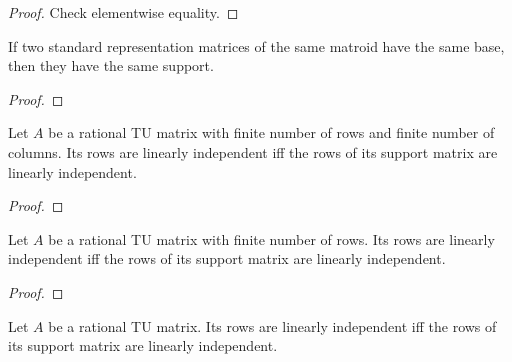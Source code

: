 \begin{proof}
    \leanok
    Check elementwise equality.
\end{proof}

\begin{lemma}
    \label{support_eq_support_of_same_matroid_same_X}
    \leanok
    If two standard representation matrices of the same matroid have the same base, then they have the same support.
\end{lemma}

\begin{proof}
    \leanok
    \SeeLean
\end{proof}

\begin{lemma}
    \label{Matrix.IsTotallyUnimodular.linearIndependent_iff_support_linearIndependent_of_finite_of_finite}
    \leanok
    Let $A$ be a rational TU matrix with finite number of rows and finite number of columns.
    Its rows are linearly independent iff the rows of its support matrix are linearly independent.
\end{lemma}

\begin{proof}
    \leanok
    \SeeLean
\end{proof}

\begin{lemma}
    \label{Matrix.IsTotallyUnimodular.linearIndependent_iff_support_linearIndependent_of_finite}
    \leanok
    Let $A$ be a rational TU matrix with finite number of rows.
    Its rows are linearly independent iff the rows of its support matrix are linearly independent.
\end{lemma}

\begin{proof}
    \leanok
    \SeeLean
\end{proof}

\begin{lemma}
    \label{Matrix.IsTotallyUnimodular.linearIndependent_iff_support_linearIndependent}
    \leanok
    Let $A$ be a rational TU matrix.
    Its rows are linearly independent iff the rows of its support matrix are linearly independent.
\end{lemma}

